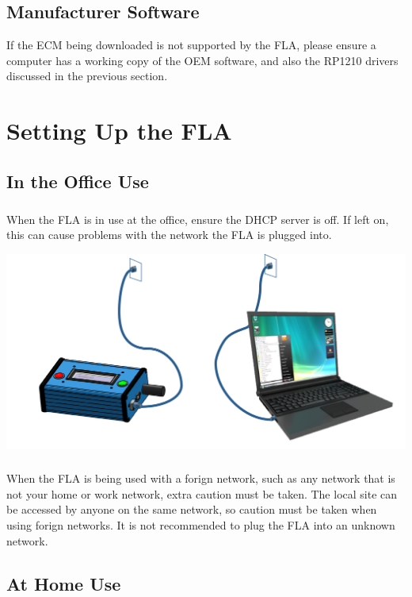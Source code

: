 \documentclass[11pt, oneside]{book}
\begin{document}
\section{Manufacturer Software}
If the ECM being downloaded is not supported by the FLA, please ensure a computer has a working copy of the OEM software, and also the RP1210 drivers discussed in the previous section.

\chapter{Setting Up the FLA}
\section{In the Office Use}\label{sec:setting_fla_in_office}
\paragraph{  }
When the FLA is in use at the office, ensure the DHCP server is off. If left on, this can cause problems with the network the FLA is plugged into.
\begin{center}
\includegraphics[width=.9\linewidth]{../media/graphics/fla_in_office}
\end{center}
\paragraph{  }
When the FLA is being used with a forign network, such as any network that is not your home or work network, extra caution must be taken. The local site can be accessed by anyone on the same network, so caution must be taken when using forign networks. It is not recommended to plug the FLA into an unknown network.
\section{At Home Use}\label{sec:setting_fla_at_home}
\end{document}
